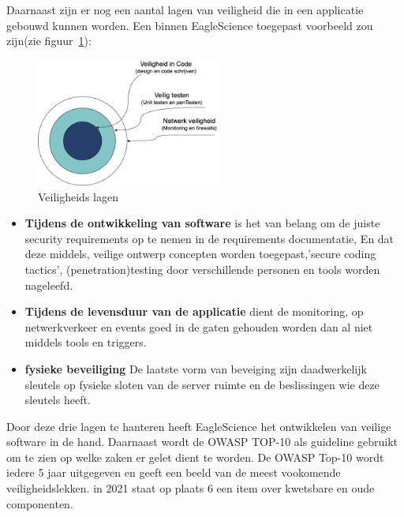 Daarnaast zijn er nog een aantal lagen van veiligheid die in een applicatie gebouwd kunnen worden.
Een binnen EagleScience toegepast voorbeeld zou zijn(zie figuur~\ref{fig:veiligheidslagen}):

\begin{figure}[H]
    \centering
    \includegraphics[width=6cm]{gfx/veiligheids lagen}
    \caption{Veiligheids lagen}
    \label{fig:veiligheidslagen}
\end{figure}

\begin{itemize}
    \item \textbf{Tijdens de ontwikkeling van software} is het van belang om de juiste security requirements op te nemen in de requirements documentatie, En dat deze middels, veilige ontwerp concepten worden toegepast,'secure coding tactics', (penetration)testing door verschillende personen en tools worden nageleefd.
    \item \textbf{Tijdens de levensduur van de applicatie} dient de monitoring, op netwerkverkeer en events goed in de gaten gehouden worden dan al niet middels tools en triggers.
    \item \textbf{fysieke beveiliging} De laatste vorm van beveiging zijn daadwerkelijk sleutels op fysieke sloten van de server ruimte en de beslissingen wie deze sleutels heeft.
\end{itemize}
Door deze drie lagen te hanteren heeft EagleScience het ontwikkelen van veilige software in de hand. Daarnaast wordt de OWASP TOP-10 als guideline gebruikt om te zien op welke zaken er gelet dient te worden. De OWASP Top-10 wordt iedere 5 jaar uitgegeven en geeft een beeld van de meest vookomende veiligheidslekken. in 2021 staat op plaats 6 een item over kwetsbare en oude componenten. \cite{Kohnfelder2021}


